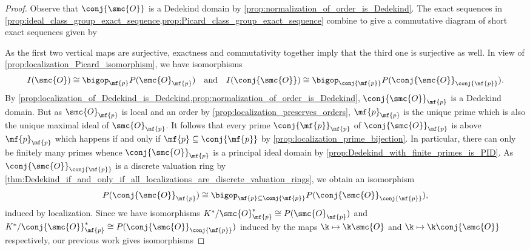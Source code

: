 \documentclass[12pt]{article}
\begin{document}
      \begin{proof}
        Observe that \(\conj{\smc{O}}\) is a Dedekind domain by \cref{prop:normalization_of_order_is_Dedekind}. The exact sequences in \cref{prop:ideal_class_group_exact_sequence,prop:Picard_class_group_exact_sequence} combine to give a commutative diagram of short exact sequences given by
        \begin{center}
        \end{center}
        As the first two vertical maps are surjective, exactness and commutativity together imply that the third one is surjective as well. In view of \cref{prop:localization_Picard_isomorphism}, we have isomorphisms
        \[
          I(\smc{O}) \cong \bigop_{\mf{p}}P(\smc{O}_{\mf{p}}) \quad \text{and} \quad I(\conj{\smc{O}}) \cong \bigop_{\conj{\mf{p}}}P(\conj{\smc{O}}_{\conj{\mf{p}}}).
        \]
        By \cref{prop:localization_of_Dedekind_is_Dedekind,prop:normalization_of_order_is_Dedekind}, \(\conj{\smc{O}}_{\mf{p}}\) is a Dedekind domain. But as \(\smc{O}_{\mf{p}}\) is local and an order by \cref{prop:localization_preserves_orders}, \(\mf{p}_{\mf{p}}\) is the unique prime which is also the unique maximal ideal of \(\smc{O}_{\mf{p}}\). It follows that every prime \(\conj{\mf{p}}_{\mf{p}}\) of \(\conj{\smc{O}}_{\mf{p}}\) is above \(\mf{p}_{\mf{p}}\) which happens if and only if \(\mf{p} \subseteq \conj{\mf{p}}\) by \cref{prop:localization_prime_bijection}. In particular, there can only be finitely many primes whence \(\conj{\smc{O}}_{\mf{p}}\) is a principal ideal domain by \cref{prop:Dedekind_with_finite_primes_is_PID}. As \(\conj{\smc{O}}_{\conj{\mf{p}}}\) is a discrete valuation ring by \cref{thm:Dedekind_if_and_only_if_all_localizations_are_discrete_valuation_rings}, we obtain an isomorphism
        \[
          P(\conj{\smc{O}}_{\mf{p}}) \cong \bigop_{\mf{p} \subseteq \conj{\mf{p}}}P(\conj{\smc{O}}_{\conj{\mf{p}}}),
        \]
        induced by localization. Since we have isomorphisms \(K^{\ast}/\smc{O}_{\mf{p}}^{\ast} \cong P(\smc{O}_{\mf{p}})\) and \(K^{\ast}/\conj{\smc{O}}_{\mf{p}}^{\ast} \cong P(\conj{\smc{O}}_{\conj{\mf{p}}})\) induced by the maps \(\k \mapsto \k\smc{O}\) and \(\k \mapsto \k\conj{\smc{O}}\) respectively, our previous work gives isomorphisms

\end{proof}
\end{document}
